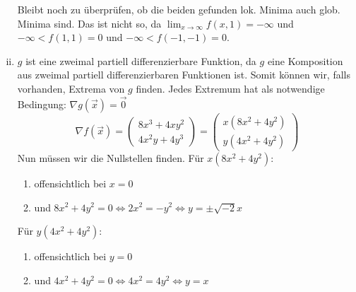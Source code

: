 \documentclass[10pt,a4paper,parskip=half]{scrartcl}
\begin{document}
\begin{enumerate}[(i)]
	Bleibt noch zu überprüfen, ob die beiden gefunden lok. Minima auch glob. Minima sind.
	Das ist nicht so, da $\lim_{x \to \infty} f(x,1) = -\infty$ und $-\infty < f(1,1) = 0$ und $-\infty < f(-1,-1) = 0$.
	
	\item	
\(g\) ist eine zweimal partiell differenzierbare Funktion, da \(g\) eine Komposition aus zweimal partiell differenzierbaren Funktionen ist. Somit können wir, falls vorhanden, Extrema von $g$ finden. Jedes Extremum hat als notwendige Bedingung: $\nabla g(\vec x) = \vec 0$
	\[ \nabla f (\vec x) = 
	\begin{pmatrix}
		8x^3  +4xy^2\\
		 4x^2y + 4y^3
	\end{pmatrix} =  
	\begin{pmatrix}
		x(8x^2+4y^2) \\
		y(4x^2 +  4y^2)
	\end{pmatrix}  \]
Nun müssen wir die Nullstellen finden. Für $x(8x^2+4y^2)$:
\begin{enumerate}
\item offensichtlich bei $x=0$
\item und $8x^2+4y^2 = 0 \Leftrightarrow 2x^2 = -y^2 \Leftrightarrow y = \pm \sqrt{-2} x$
\end{enumerate}
Für $y(4x^2 +  4y^2)$:
\begin{enumerate}
\item offensichtlich bei $y=0$
\item und $4x^2 +  4y^2 = 0 \Leftrightarrow 4x^2 = 4y^2 \Leftrightarrow y = x$
\end{enumerate} 


\end{enumerate}
\end{document}
